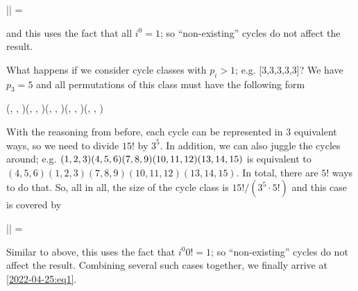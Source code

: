 \bee
|\Cc| = 
\eee

and this uses the fact that all $i^0 = 1$; so ``non-existing'' cycles do not affect the result.

What happens if we consider cycle classes with $p_i > 1$; e.g. [3,3,3,3,3]? We have $p_3=5$ and all permutations of this class must have the following form

\bee
(\cdot, \cdot, \cdot)(\cdot, \cdot, \cdot)(\cdot, \cdot, \cdot)(\cdot, \cdot, \cdot)(\cdot, \cdot, \cdot)
\eee

With the reasoning from before, each cycle can be represented in $3$ equivalent ways, so we need to divide $15!$ by $3^5$. In addition, we can also juggle the cycles around; e.g. $(1,2,3)(4,5,6)(7,8,9)\\(10,11,12)(13,14,15)$ is equivalent to $(4,5,6)(1,2,3)(7,8,9)(10,11,12)(13,14,15)$. In total, there are $5!$ ways to do that. So, all in all, the size of the cycle class is $15!/(3^5 \cdot 5!)$ and this case is covered by

\bee
|\Cc| = 
\eee

Similar to above, this uses the fact that $i^0 0! = 1$; so ``non-existing'' cycles do not affect the result. Combining several such cases together, we finally arrive at \eqref{2022-04-25:eq1}.

